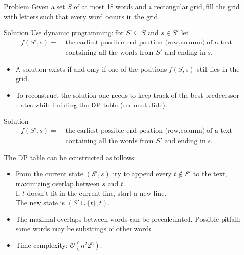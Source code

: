 \begin{slide}
  \begin{block}{Problem}
    Given a set $S$ of at most 18 words and a rectangular grid, fill the grid
    with letters such that every word occurs in the grid.
  \end{block}
  \pause
  \begin{block}{Solution}
    Use dynamic programming: for $S' \subseteq S$ and $s \in S'$ let
    \begin{align*}
      f(S',s) = & \text{ the earliest possible end position (row,column) of a text} \\
                & \text{ containing all the words from $S'$ and ending in $s$.}
    \end{align*}
    \vspace{-0.5cm}
    \begin{itemize}
      \item A solution exists if and only if one of the positions $f(S,s)$
        still lies in the grid.
      \item To reconstruct the solution one needs to keep track of the best predecessor
        states while building the DP table (see next slide).
    \end{itemize}
  \end{block}
\end{slide}
\begin{slide}
  \begin{block}{Solution}
    \vspace{-0.5cm} 
    \begin{align*}
      f(S',s) = & \text{ the earliest possible end position (row,column) of a text} \\
                & \text{ containing all the words from $S'$ and ending in $s$.}
    \end{align*}

    The DP table can be constructed as follows:
    \begin{itemize}
      \item From the current state $(S',s)$ try to append every $t \notin S'$
        to the text, maximizing overlap between $s$ and $t$. \\
        If $t$ doesn't fit in the current line, start a new line. \\
        The new state is $(S' \cup \{t\},t)$.
      \item The maximal overlaps between words can be precalculated.
        Possible pitfall: some words may be substrings of other words.
      \item Time complexity: $\mathcal{O}(n^2 2^n)$.
    \end{itemize}
  \end{block}
\end{slide}
